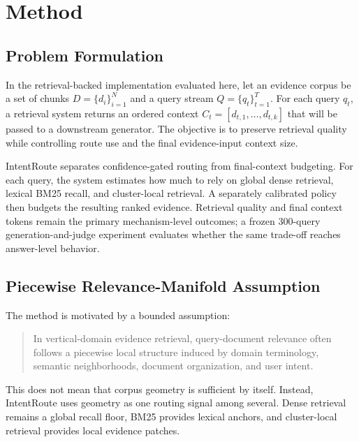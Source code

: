 
\section{Method}
\label{sec:04-method:method}

\subsection{Problem Formulation}
\label{sec:04-method:problem-formulation}

In the retrieval-backed implementation evaluated here, let an evidence corpus be a set of chunks $D = \{d_i\}_{i=1}^{N}$ and a query stream $Q = \{q_t\}_{t=1}^{T}$. For each query $q_t$, a retrieval system returns an ordered context $C_t = [d_{t,1}, \ldots, d_{t,k}]$ that will be passed to a downstream generator. The objective is to preserve retrieval quality while controlling route use and the final evidence-input context size.

IntentRoute separates confidence-gated routing from final-context budgeting. For each query, the system estimates how much to rely on global dense retrieval, lexical BM25 recall, and cluster-local retrieval. A separately calibrated policy then budgets the resulting ranked evidence. Retrieval quality and final context tokens remain the primary mechanism-level outcomes; a frozen 300-query generation-and-judge experiment evaluates whether the same trade-off reaches answer-level behavior.

\subsection{Piecewise Relevance-Manifold Assumption}
\label{sec:04-method:piecewise-relevance-manifold-assumption}

The method is motivated by a bounded assumption:

\begin{quote}
In vertical-domain evidence retrieval, query-document relevance often follows a piecewise local structure induced by domain terminology, semantic neighborhoods, document organization, and user intent.
\end{quote}

This does not mean that corpus geometry is sufficient by itself. Instead, IntentRoute uses geometry as one routing signal among several. Dense retrieval remains a global recall floor, BM25 provides lexical anchors, and cluster-local retrieval provides local evidence patches.

